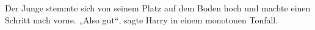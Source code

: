 Der Junge stemmte sich von seinem Platz auf dem Boden hoch und machte einen Schritt nach vorne.
„Also gut“, sagte Harry in einem monotonen Tonfall.
